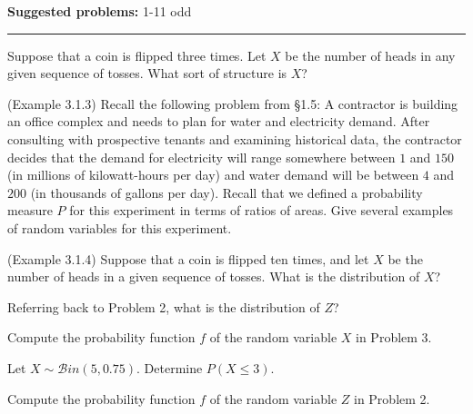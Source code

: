 \documentclass[12pt,reqno]{amsart}
\begin{document}
\textbf{Suggested problems:} 1-11 odd

\bigskip
\hrule

\bigskip

\prob Suppose that a coin is flipped three times. Let $X$ be the number of heads in any given sequence of tosses. What sort of structure is $X$?

\vfill
\prob (Example 3.1.3) Recall the following problem from \S1.5: A contractor is building an office complex and needs to plan for water and electricity demand. After consulting with prospective tenants and examining historical data, the contractor decides that the demand for electricity will range somewhere between $1$ and $150$ (in millions of kilowatt-hours per day) and water demand will be between $4$ and $200$ (in thousands of gallons per day). Recall that we defined a probability measure $P$ for this experiment in terms of ratios of areas. Give several examples of random variables for this experiment.

\vfill
\prob (Example 3.1.4) Suppose that a coin is flipped ten times, and let $X$ be the number of heads in a given sequence of tosses. What is the distribution of $X$?

\vfill
\newpage
\prob Referring back to Problem 2, what is the distribution of $Z$?

\vfill
\prob Compute the probability function $f$ of the random variable $X$ in Problem 3.

\vfill
\prob Let $X \sim \mathcal{B}in(5, 0.75)$. Determine $P(X \leq 3)$.

\vfill
\prob Compute the probability function $f$ of the random variable $Z$ in Problem 2.

\vfill
\end{document}
